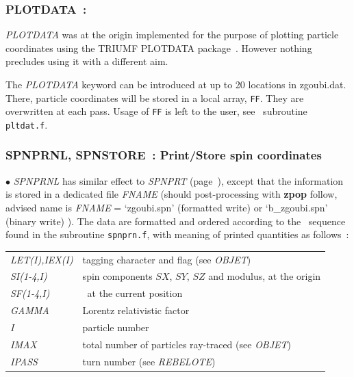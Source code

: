 {\newpage


\subsubsection{PLOTDATA~: \PLOTDATATitl} \label{PLOTDATA} 

\medskip

\noindent  \textsl{PLOTDATA} was at the origin implemented for the purpose of plotting particle 
coordinates using the TRIUMF PLOTDATA package~\protect\cite{BiblioPlot}. However nothing precludes using it 
with a different aim. 

\medskip

\noindent  The \textsl{PLOTDATA} keyword can be introduced at up to 20 locations in zgoubi.dat.  There, particle coordinates 
will be stored in a local array, \texttt{FF}. They are overwritten at each pass. Usage of \texttt{FF} is left to the user, 
see \FORTRAN\ subroutine \texttt{pltdat.f}. 


\newpage

\subsubsection{SPNPRNL, SPNSTORE~: Print/Store spin coordinates}
       \label{SPNPRNL} \label{SPNSTORE}

\medskip 

\noindent  $\bullet$   \textsl{SPNPRNL} has similar effect to \textsl{SPNPRT} (page~\pageref{SPNPRT}), 
except that the information is
stored in a  dedicated file \textsl{FNAME} (should post-processing with \textbf{zpop} follow, 
advised name is \textsl{FNAME} = `zgoubi.spn' (formatted write) or `b\_zgoubi.spn' (binary write) ). 
The data are formatted and ordered according to the  \FORTRAN\ sequence found in the subroutine \texttt{spnprn.f}, 
with meaning of printed quantities as follows~: 

\medskip

 \begin{tabular}{>{\sl}l!{~:}l}
	 LET(I),IEX(I)  &  tagging character and flag (see \textsl{OBJET}) \\   
	 SI(1-4,I) & spin components $SX$, $SY$, $SZ$  and modulus, at the origin\\
	 SF(1-4,I)   &  \id\, at the current position\\
	  GAMMA &   Lorentz relativistic factor\\
	  I  &  particle number\\
	 IMAX &  total number of particles ray-traced (see  \textsl{OBJET})\\
	 IPASS &  turn number (see \textsl{REBELOTE})\\
 \end{tabular}

}

